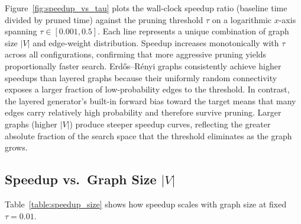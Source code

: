 Figure~\ref{fig:speedup_vs_tau} plots the wall-clock speedup ratio (baseline time divided by pruned time) against the pruning threshold $\tau$ on a logarithmic $x$-axis spanning $\tau \in [0.001, 0.5]$. Each line represents a unique combination of graph size $|V|$ and edge-weight distribution. Speedup increases monotonically with $\tau$ across all configurations, confirming that more aggressive pruning yields proportionally faster search. Erd\H{o}s--R\'{e}nyi graphs consistently achieve higher speedups than layered graphs because their uniformly random connectivity exposes a larger fraction of low-probability edges to the threshold. In contrast, the layered generator's built-in forward bias toward the target means that many edges carry relatively high probability and therefore survive pruning. Larger graphs (higher $|V|$) produce steeper speedup curves, reflecting the greater absolute fraction of the search space that the threshold eliminates as the graph grows.

\subsection{Speedup vs.\ Graph Size \texorpdfstring{$|V|$}{|V|}}

Table~\ref{table:speedup_size} shows how speedup scales with graph size at fixed $\tau = 0.01$.

\begin{table}[htbp]
\centering
\small
\renewcommand{\arraystretch}{1.3}
\caption[Speedup scaling by graph size]{Median speedups at $\tau=0.01$ by graph size. ``All'' includes termination-without-path rows; ``found'' is restricted to path-found configurations.}
\label{table:speedup_size}
\end{table}

